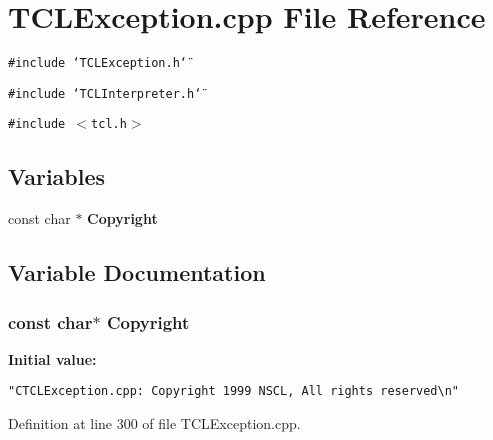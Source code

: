 \section{TCLException.cpp File Reference}
\label{TCLException_8cpp}
{\tt \#include \char`\"{}TCLException.h\char`\"{}}\par
{\tt \#include \char`\"{}TCLInterpreter.h\char`\"{}}\par
{\tt \#include $<$tcl.h$>$}\par
\subsection*{Variables}
\begin{CompactItemize}
\item 
const char $\ast$ {\bf Copyright}
\end{CompactItemize}


\subsection{Variable Documentation}
\subsubsection{\setlength{\rightskip}{0pt plus 5cm}const char$\ast$ Copyright\hspace{0.3cm}{\tt  [static]}}\label{TCLException_8cpp_a0}


{\bf Initial value:}

\footnotesize\begin{verbatim} 
"CTCLException.cpp: Copyright 1999 NSCL, All rights reserved\n"\end{verbatim}\normalsize 


Definition at line 300 of file TCLException.cpp.